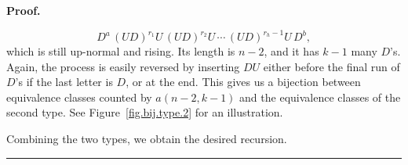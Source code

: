\documentclass[numbers=enddot,12pt,final,onecolumn,notitlepage]{scrartcl}%
\theoremstyle{definition}
\newenvironment{proof}[1][Proof]{\noindent\textbf{#1.} }{\ \rule{0.5em}{0.5em}}
\begin{document}
\begin{proof}
\begin{enumerate}[itemindent=.7cm,label=\textbf{Type \arabic*:}]
\[D^a\, (UD)^{r_1}U\, (UD)^{r_2}U\, \cdots\, (UD)^{r_h-1}U\, D^b,\]
which is still up-normal and rising. Its length is $n-2$, and it has $k-1$ many $D$'s. 
Again, the process is easily reversed by inserting $DU$ either before the final run of $D$'s if the last letter is $D$, or at the end.
This gives us a bijection between equivalence classes counted by $a(n-2,k-1)$ and the equivalence classes of the second type. See Figure~\ref{fig.bij.type.2} for an illustration.
\end{enumerate}
Combining the two types, we obtain the desired recursion.
\end{proof}
\end{document}
